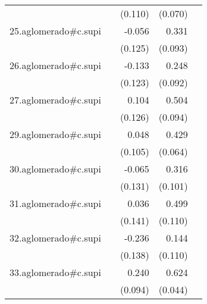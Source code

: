 {\begin{longtable}{l*{4}{D{.}{.}{-1}}}
            &                     &     (0.110)         &     (0.070)         &                     \\
\addlinespace
25.aglomerado#c.supi&                     &      -0.056         &       0.331\sym{***}&                     \\
            &                     &     (0.125)         &     (0.093)         &                     \\
\addlinespace
26.aglomerado#c.supi&                     &      -0.133         &       0.248\sym{**} &                     \\
            &                     &     (0.123)         &     (0.092)         &                     \\
\addlinespace
27.aglomerado#c.supi&                     &       0.104         &       0.504\sym{***}&                     \\
            &                     &     (0.126)         &     (0.094)         &                     \\
\addlinespace
29.aglomerado#c.supi&                     &       0.048         &       0.429\sym{***}&                     \\
            &                     &     (0.105)         &     (0.064)         &                     \\
\addlinespace
30.aglomerado#c.supi&                     &      -0.065         &       0.316\sym{**} &                     \\
            &                     &     (0.131)         &     (0.101)         &                     \\
\addlinespace
31.aglomerado#c.supi&                     &       0.036         &       0.499\sym{***}&                     \\
            &                     &     (0.141)         &     (0.110)         &                     \\
\addlinespace
32.aglomerado#c.supi&                     &      -0.236         &       0.144         &                     \\
            &                     &     (0.138)         &     (0.110)         &                     \\
\addlinespace
33.aglomerado#c.supi&                     &       0.240\sym{*}  &       0.624\sym{***}&                     \\
            &                     &     (0.094)         &     (0.044)         &                     \\

\end{longtable}}
